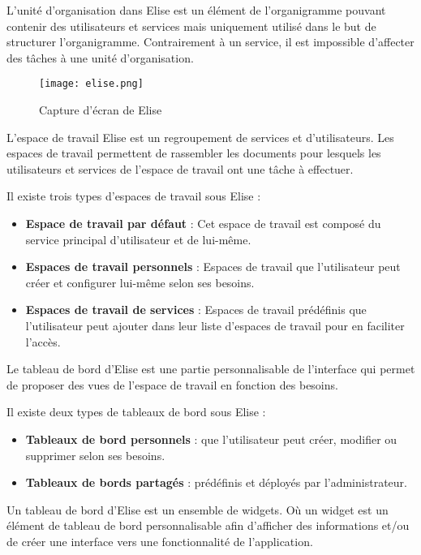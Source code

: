L'unité d'organisation dans Elise est un élément de l'organigramme pouvant contenir des utilisateurs et services mais uniquement utilisé dans le but de structurer l'organigramme. Contrairement à un service, il est impossible d'affecter des tâches à une unité d'organisation.

\begin{figure}[!h]
\centering
\texttt{[image: elise.png]}
\caption{Capture d'écran de Elise}
\label{fig:captureElise}
\end{figure}


L'espace de travail Elise est un regroupement de services et d'utilisateurs. Les espaces de travail permettent de rassembler les documents pour lesquels les utilisateurs et services de l'espace de travail ont une tâche à effectuer.

Il existe trois types d'espaces de travail sous Elise :

\begin{itemize}

\item \textbf{Espace de travail par défaut} : Cet espace de travail est composé du service principal d'utilisateur et de lui-même.
\item \textbf{Espaces de travail personnels} : Espaces de travail que l'utilisateur peut créer et configurer lui-même selon ses besoins.
\item \textbf{Espaces de travail de services} : Espaces de travail prédéfinis que l'utilisateur peut ajouter dans leur liste d'espaces de travail pour en faciliter l'accès.
\end{itemize}

Le tableau de bord d'Elise est une partie personnalisable de l'interface qui permet de proposer des vues de l'espace de travail en fonction des besoins. 

Il existe deux types de tableaux de bord sous Elise :

\begin{itemize}
\item \textbf{Tableaux de bord personnels} : que l'utilisateur peut créer, modifier ou supprimer selon ses besoins.
\item \textbf{Tableaux de bords partagés} : prédéfinis et déployés par l'administrateur.
\end{itemize}

Un tableau de bord d'Elise est un ensemble de widgets. Où un widget est un élément de tableau de bord personnalisable afin d'afficher des informations et/ou de créer une interface vers une fonctionnalité de l'application.

